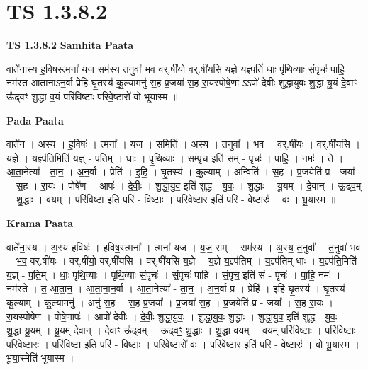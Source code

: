 \documentclass[17pt]{extarticle}
\begin{document}
\section*{ TS 1.3.8.2 }

\textbf{TS 1.3.8.2 } \newline
\textbf{Samhita Paata} \newline

वाते॑ना॒स्य ह॒विष॒स्त्मना॑ यज॒ सम॑स्य त॒नुवा॑ भव॒ वर्.षी॑यो॒ वर्.षी॑यसि य॒ज्ञे य॒ज्ञ्पतिं॑ धाः पृ॑थि॒व्याः सं॒पृचः॑ पाहि॒ नम॑स्त आतानाऽन॒र्वा प्रेहि॑ घृ॒तस्य॑ कु॒॒ल्यामनु॑ स॒ह प्र॒जया॑ स॒ह रा॒यस्पोषे॒णा ऽऽपो॑ देवीः शुद्धायुवः शु॒द्धा यू॒यं दे॒वाꣳ ऊ᳚ढ्वꣳ शु॒द्धा व॒यं परि॑विष्टाः परिवे॒ष्टारो॑ वो भूयास्म ॥ \newline

\textbf{Pada Paata} \newline

वाते॑न । अ॒स्य । ह॒विषः॑ । त्मना᳚ । य॒ज॒ । समिति॑ । अ॒स्य॒ । त॒नुवा᳚ । भ॒व॒ । वर्.षी॑यः । वर्.षी॑यसि । य॒ज्ञे । य॒ज्ञ्प॑ति॒मिति॑ य॒ज्ञ् - प॒ति॒म् । धाः॒ । पृ॒थि॒व्याः । स॒म्पृच॒ इति॑ सम् - पृचः॑ । पा॒हि॒ । नमः॑ । ते॒ । आ॒ता॒नेत्या᳚ - ता॒न॒ । अ॒न॒र्वा । प्रेति॑ । इ॒हि॒ । घृ॒तस्य॑ । कु॒॒ल्याम् । अन्विति॑ । स॒ह । प्र॒जयेति॑ प्र - जया᳚ । स॒ह । रा॒यः । पोषे॑ण । आपः॑ । दे॒वीः॒ । शु॒द्धा॒यु॒व॒ इति॑ शुद्ध - यु॒वः॒ । शु॒द्धाः । यू॒यम् । दे॒वान् । ऊ॒ढ्व॒म् । शु॒द्धाः । व॒यम् । परि॑विष्टा॒ इति॒ परि॑ - वि॒ष्टाः॒ । प॒रि॒वे॒ष्टार॒ इति॑ परि - वे॒ष्टारः॑ । वः॒ । भू॒या॒स्म॒ ॥  \newline


\textbf{Krama Paata} \newline

वाते॑ना॒स्य । अ॒स्य ह॒विषः॑ । ह॒विष॒स्त्मना᳚ । त्मना॑ यज । य॒ज॒ सम् । सम॑स्य । अ॒स्य॒ त॒नुवा᳚ । त॒नुवा॑ भव । भ॒व॒ वर्.षी॑यः । वर्.षी॑यो॒ वर्.षी॑यसि । वर्.षी॑यसि य॒ज्ञे । य॒ज्ञे य॒ज्ञ्प॑तिम् । य॒ज्ञ्प॑तिम् धाः । य॒ज्ञ्प॑ति॒मिति॑ य॒ज्ञ् - प॒ति॒म् । धाः॒ पृ॒थि॒व्याः । पृ॒थि॒व्याः सं॒पृचः॑ । सं॒पृचः॑ पाहि । सं॒पृच॒ इति॑ सं - पृचः॑ । पा॒हि॒ नमः॑ । नम॑स्ते । त॒ आ॒ता॒न॒ । आ॒ता॒ना॒न॒र्वा । आ॒ता॒नेत्या᳚ - ता॒न॒ । अ॒न॒र्वा प्र । प्रेहि॑ । इ॒हि॒ घृ॒तस्य॑ । घृ॒तस्य॑ कु॒ल्याम् । कु॒ल्यामनु॑ । अनु॑ स॒ह । स॒ह प्र॒जया᳚ । प्र॒जया॑ स॒ह । प्र॒जयेति॑ प्र - जया᳚ । स॒ह रा॒यः । रा॒यस्पोषे॑ण । पोषे॒णापः॑ । आपो॑ देवीः । दे॒वीः॒ शु॒द्धा॒यु॒वः॒ । शु॒द्धा॒यु॒वः॒ शु॒द्धाः । शु॒द्धा॒यु॒व॒ इति॑ शुद्ध - यु॒वः॒ । शु॒द्धा यू॒यम् । यू॒यम् दे॒वान् । दे॒वाꣳ ऊ᳚ढ्वम् । ऊ॒ढ्वꣳ॒॒ शु॒द्धाः । शु॒द्धा व॒यम् । व॒यम् परि॑विष्टाः । परि॑विष्टाः परिवे॒ष्टारः॑ । परि॑विष्टा॒ इति॒ परि॑ - वि॒ष्टाः॒ । प॒रि॒वे॒ष्टारो॑ वः । प॒रि॒वे॒ष्टार॒ इति॑ परि - वे॒ष्टारः॑ । वो॒ भू॒या॒स्म॒ । भू॒या॒स्मेति॑ भूयास्म । \newline
\end{document}
